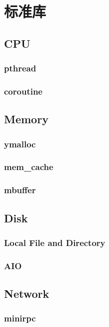 \chapter{标准库}

\section{CPU}

\subsection{pthread}
\subsection{coroutine}

\section{Memory}

\subsection{ymalloc}
\subsection{mem\_cache}
\subsection{mbuffer}

\section{Disk}

\subsection{Local File and Directory}
\subsection{AIO}

\section{Network}

\subsection{minirpc}

